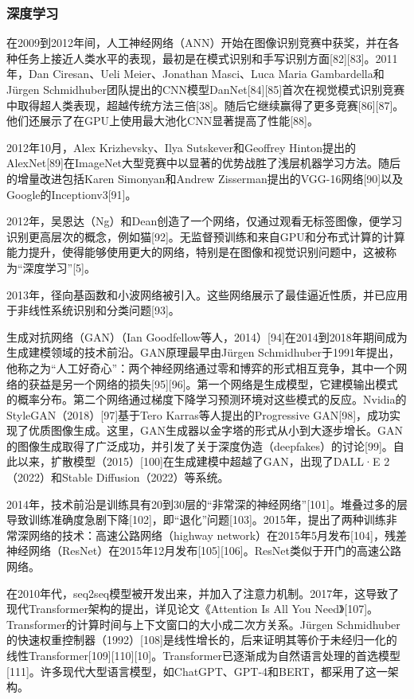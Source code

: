 \subsubsection{深度学习}
在2009到2012年间，人工神经网络（ANN）开始在图像识别竞赛中获奖，并在各种任务上接近人类水平的表现，最初是在模式识别和手写识别方面[82][83]。2011年，Dan Ciresan、Ueli Meier、Jonathan Masci、Luca Maria Gambardella和Jürgen Schmidhuber团队提出的CNN模型DanNet[84][85]首次在视觉模式识别竞赛中取得超人类表现，超越传统方法三倍[38]。随后它继续赢得了更多竞赛[86][87]。他们还展示了在GPU上使用最大池化CNN显著提高了性能[88]。

2012年10月，Alex Krizhevsky、Ilya Sutskever和Geoffrey Hinton提出的AlexNet[89]在ImageNet大型竞赛中以显著的优势战胜了浅层机器学习方法。随后的增量改进包括Karen Simonyan和Andrew Zisserman提出的VGG-16网络[90]以及Google的Inceptionv3[91]。

2012年，吴恩达（Ng）和Dean创造了一个网络，仅通过观看无标签图像，便学习识别更高层次的概念，例如猫[92]。无监督预训练和来自GPU和分布式计算的计算能力提升，使得能够使用更大的网络，特别是在图像和视觉识别问题中，这被称为“深度学习”[5]。

2013年，径向基函数和小波网络被引入。这些网络展示了最佳逼近性质，并已应用于非线性系统识别和分类问题[93]。

生成对抗网络（GAN）（Ian Goodfellow等人，2014）[94]在2014到2018年期间成为生成建模领域的技术前沿。GAN原理最早由Jürgen Schmidhuber于1991年提出，他称之为“人工好奇心”：两个神经网络通过零和博弈的形式相互竞争，其中一个网络的获益是另一个网络的损失[95][96]。第一个网络是生成模型，它建模输出模式的概率分布。第二个网络通过梯度下降学习预测环境对这些模式的反应。Nvidia的StyleGAN（2018）[97]基于Tero Karras等人提出的Progressive GAN[98]，成功实现了优质图像生成。这里，GAN生成器以金字塔的形式从小到大逐步增长。GAN的图像生成取得了广泛成功，并引发了关于深度伪造（deepfakes）的讨论[99]。自此以来，扩散模型（2015）[100]在生成建模中超越了GAN，出现了DALL·E 2（2022）和Stable Diffusion（2022）等系统。

2014年，技术前沿是训练具有20到30层的“非常深的神经网络”[101]。堆叠过多的层导致训练准确度急剧下降[102]，即“退化”问题[103]。2015年，提出了两种训练非常深网络的技术：高速公路网络（highway network）在2015年5月发布[104]，残差神经网络（ResNet）在2015年12月发布[105][106]。ResNet类似于开门的高速公路网络。

在2010年代，seq2seq模型被开发出来，并加入了注意力机制。2017年，这导致了现代Transformer架构的提出，详见论文《Attention Is All You Need》[107]。Transformer的计算时间与上下文窗口的大小成二次方关系。Jürgen Schmidhuber的快速权重控制器（1992）[108]是线性增长的，后来证明其等价于未经归一化的线性Transformer[109][110][10]。Transformer已逐渐成为自然语言处理的首选模型[111]。许多现代大型语言模型，如ChatGPT、GPT-4和BERT，都采用了这一架构。
